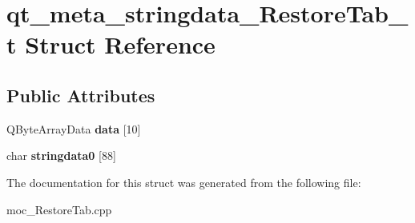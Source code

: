 \hypertarget{structqt__meta__stringdata__RestoreTab__t}{}\section{qt\+\_\+meta\+\_\+stringdata\+\_\+\+Restore\+Tab\+\_\+t Struct Reference}
\label{structqt__meta__stringdata__RestoreTab__t}
\subsection*{Public Attributes}
\begin{DoxyCompactItemize}
\item 
\mbox{\label{structqt__meta__stringdata__RestoreTab__t_ae65b519ce9ee3f62ede6129255212be8}} 
Q\+Byte\+Array\+Data {\bfseries data} \mbox{[}10\mbox{]}
\item 
\mbox{\label{structqt__meta__stringdata__RestoreTab__t_a1b27dc533cd8198d21f7dd99ad1c4b53}} 
char {\bfseries stringdata0} \mbox{[}88\mbox{]}
\end{DoxyCompactItemize}


The documentation for this struct was generated from the following file\+:\begin{DoxyCompactItemize}
\item 
moc\+\_\+\+Restore\+Tab.\+cpp\end{DoxyCompactItemize}
